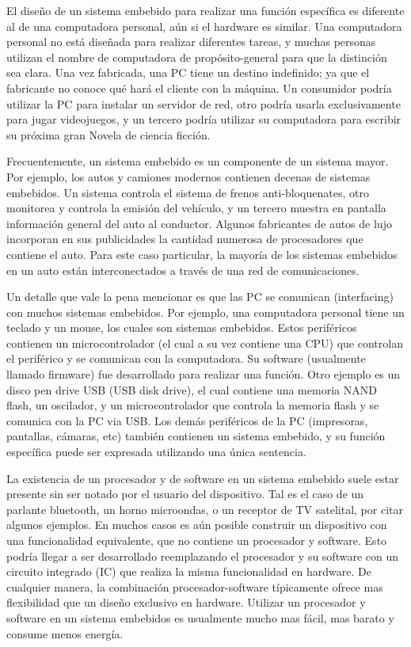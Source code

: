 \documentclass[output=paper, 
colorlinks,
citecolor=brown,
newtxmath
]{langscibook}
\begin{document}
El diseño de un sistema embebido para realizar una función específica es diferente al de una
computadora personal, aún si el hardware es similar. Una computadora personal no está diseñada
para realizar diferentes tareas, y muchas personas utilizan el nombre de computadora de propósito-general
para que la distinción sea clara. Una vez fabricada, una PC tiene un destino indefinido; 
ya que el fabricante no conoce qué hará el cliente con la máquina. Un consumidor podría utilizar
la PC para instalar un servidor de red, otro podría usarla exclusivamente para jugar videojuegos,
y un tercero podría utilizar su computadora para escribir su próxima gran Novela de ciencia ficción.


Frecuentemente, un sistema embebido es un componente de un sistema mayor. Por ejemplo, 
los autos y camiones modernos contienen decenas de sistemas embebidos. Un sistema controla el sistema de frenos anti-bloquenates, otro monitorea y controla la emisión del vehículo, 
y un tercero muestra en pantalla información general del auto al conductor.  Algunos fabricantes de
autos de lujo incorporan en sus publicidades la cantidad numerosa de procesadores que contiene
el auto. Para este caso particular, la mayoría de los sistemas embebidos en un auto
están interconectados a través de una red de comunicaciones.



Un detalle que vale la pena mencionar es que las PC se comunican (interfacing) con 
muchos sistemas embebidos. Por ejemplo, una computadora personal tiene un teclado y un mouse,
los cuales son sistemas embebidos. Estos periféricos contienen un microcontrolador (el cual
a su vez contiene una CPU) que controlan el periférico y se comunican con la computadora.
Su software (usualmente llamado firmware) fue desarrollado para realizar una función.
Otro ejemplo es un disco pen drive USB (USB disk drive), el cual contiene una memoria NAND flash,
un oscilador, y un microcontrolador que controla la memoria flash y se comunica con la PC
via USB. Los demás periféricos de la PC (impresoras, pantallas, cámaras, etc) también
contienen un sistema embebido, y su función específica puede ser expresada utilizando
una única sentencia.

La existencia de un procesador y de software en un sistema embebido suele estar presente sin
ser notado por el usuario del dispositivo. Tal es el caso de un parlante bluetooth, un horno microondas,
o un receptor de TV satelital, por citar algunos ejemplos. En muchos casos es aún posible construir
un dispositivo con una funcionalidad equivalente, que no contiene un procesador y software. 
Esto podría llegar a ser desarrollado reemplazando el procesador y su software con un circuito integrado
(IC) que realiza la misma funcionalidad en hardware. De cualquier manera, la combinación
procesador-software típicamente ofrece mas flexibilidad que un diseño exclusivo en hardware. 
Utilizar un procesador y software en un sistema embebidos es usualmente mucho mas fácil, mas barato y 
consume menos energía.
\end{document}
